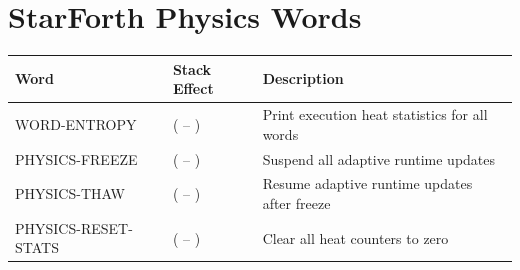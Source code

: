 \section*{StarForth Physics Words}
\begin{longtable}{>{\ttfamily}lp{4.5cm}p{7cm}}
\toprule
\normalfont Word & Stack Effect & Description \\
\midrule
\endhead
\bottomrule
\endfoot
WORD-ENTROPY        & ( -- )   & Print execution heat statistics for all words \\
PHYSICS-FREEZE      & ( -- )   & Suspend all adaptive runtime updates \\
PHYSICS-THAW        & ( -- )   & Resume adaptive runtime updates after freeze \\
PHYSICS-RESET-STATS & ( -- )   & Clear all heat counters to zero \\
\end{longtable}


